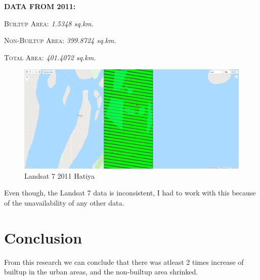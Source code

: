 \documentclass{article}
\begin{document}
\textbf{DATA FROM 2011:}

\textsc{Builtup Area: } \textit{1.5348 sq.km.}

\textsc{Non-Builtup Area: } \textit{399.8724 sq.km.}

\textsc{Total Area: } \textit{401.4072 sq.km.}

\begin{figure}[H]
\centering
\includegraphics[width=\textwidth]{2011_Hatiya_L7}
\caption{Landsat 7 2011 Hatiya}
\end{figure}

Even though, the Landsat 7 data is inconsistent, I had to work with this because of the unavailability of any other data.
\vfill

\section{Conclusion}
From this research we can conclude that there was atleast 2 times increase of builtup in the urban areas, and the non-builtup area shrinked.
\end{document}
